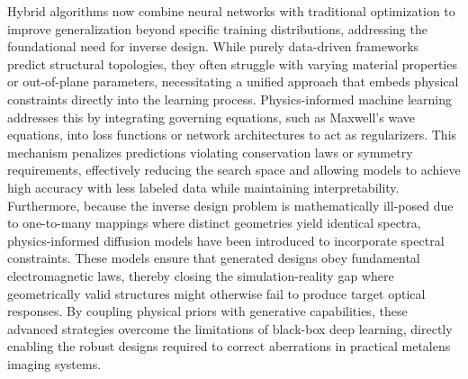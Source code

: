 Hybrid algorithms now combine neural networks with traditional optimization to improve generalization beyond specific training distributions, addressing the foundational need for inverse design. While purely data-driven frameworks predict structural topologies, they often struggle with varying material properties or out-of-plane parameters, necessitating a unified approach that embeds physical constraints directly into the learning process. Physics-informed machine learning addresses this by integrating governing equations, such as Maxwell's wave equations, into loss functions or network architectures to act as regularizers. \citep{doi_10_21070_acopen_10_2025_12939_5a404b4e} \citep{doi_10_1109_tmtt_2026_3658422_94a01e71} This mechanism penalizes predictions violating conservation laws or symmetry requirements, effectively reducing the search space and allowing models to achieve high accuracy with less labeled data while maintaining interpretability. \citep{doi_10_71465_fapm546_bda368a5} Furthermore, because the inverse design problem is mathematically ill-posed due to one-to-many mappings where distinct geometries yield identical spectra, physics-informed diffusion models have been introduced to incorporate spectral constraints. These models ensure that generated designs obey fundamental electromagnetic laws, thereby closing the simulation-reality gap where geometrically valid structures might otherwise fail to produce target optical responses. By coupling physical priors with generative capabilities, these advanced strategies overcome the limitations of black-box deep learning, directly enabling the robust designs required to correct aberrations in practical metalens imaging systems. \citep{doi_10_1002_adom_202100548_6789fa4c} \citep{doi_10_1002_adpr_202300158_66d61883} \citep{doi_10_71465_fapm546_bda368a5}

